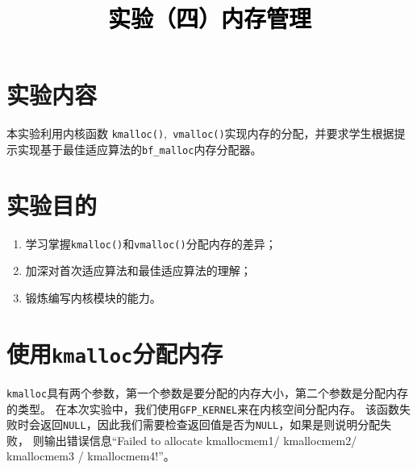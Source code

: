 \documentclass[a4paper,twoside]{article}
\newcommand{\PaperTitle}{实验（四）内存管理}  %
\begin{document}
\newpage

\title{
	\Large{\textcolor{black}{\PaperTitle}}
}

\maketitle
	
\tableofcontents
 
\newpage
\setcounter{page}{1}

\begin{spacing}{1.2}

\section{实验内容}

本实验利用内核函数 \texttt{kmalloc()},\texttt{ vmalloc()}实现内存的分配，并要求学生根据提示实现基于最佳适应算法的\texttt{bf\_malloc}内存分配器。  

\section{实验目的}

\begin{enumerate}
	\item 学习掌握\texttt{kmalloc()}和\texttt{vmalloc()}分配内存的差异；
	\item 加深对首次适应算法和最佳适应算法的理解；
	\item 锻炼编写内核模块的能力。
\end{enumerate}

\section{使用\texttt{kmalloc}分配内存}

\texttt{kmalloc}具有两个参数，第一个参数是要分配的内存大小，第二个参数是分配内存的类型。
在本次实验中，我们使用\texttt{GFP\_KERNEL}来在内核空间分配内存。
该函数失败时会返回\texttt{NULL}，因此我们需要检查返回值是否为\texttt{NULL}，如果是则说明分配失败，
则输出错误信息“Failed to allocate kmallocmem1/ kmallocmem2/ kmallocmem3 / kmallocmem4!”。


\end{spacing}
\end{document}
